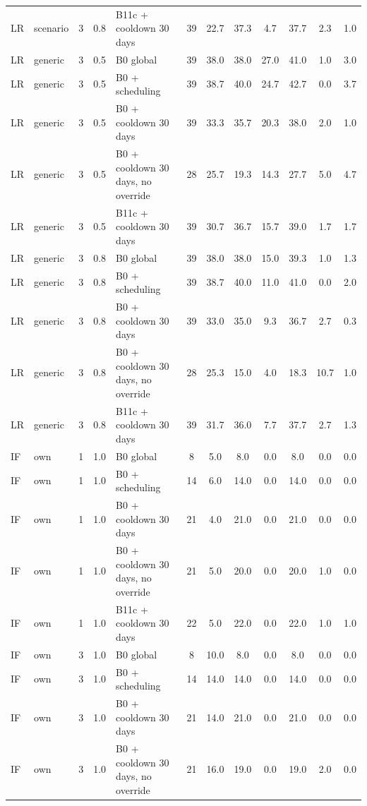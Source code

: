 \documentclass[10pt,onecolumn,letterpaper]{article}
\begin{document}
\begin{longtable}{lllllccccccc}
LR & scenario & 3 & 0.8 & B11c + cooldown 30 days & 39 & 22.7 & 37.3 & 4.7 & 37.7 & 2.3 & 1.0 \\
LR & generic & 3 & 0.5 & B0 global & 39 & 38.0 & 38.0 & 27.0 & 41.0 & 1.0 & 3.0 \\
LR & generic & 3 & 0.5 & B0 + scheduling & 39 & 38.7 & 40.0 & 24.7 & 42.7 & 0.0 & 3.7 \\
LR & generic & 3 & 0.5 & B0 + cooldown 30 days & 39 & 33.3 & 35.7 & 20.3 & 38.0 & 2.0 & 1.0 \\
LR & generic & 3 & 0.5 & B0 + cooldown 30 days, no override & 28 & 25.7 & 19.3 & 14.3 & 27.7 & 5.0 & 4.7 \\
LR & generic & 3 & 0.5 & B11c + cooldown 30 days & 39 & 30.7 & 36.7 & 15.7 & 39.0 & 1.7 & 1.7 \\
LR & generic & 3 & 0.8 & B0 global & 39 & 38.0 & 38.0 & 15.0 & 39.3 & 1.0 & 1.3 \\
LR & generic & 3 & 0.8 & B0 + scheduling & 39 & 38.7 & 40.0 & 11.0 & 41.0 & 0.0 & 2.0 \\
LR & generic & 3 & 0.8 & B0 + cooldown 30 days & 39 & 33.0 & 35.0 & 9.3 & 36.7 & 2.7 & 0.3 \\
LR & generic & 3 & 0.8 & B0 + cooldown 30 days, no override & 28 & 25.3 & 15.0 & 4.0 & 18.3 & 10.7 & 1.0 \\
LR & generic & 3 & 0.8 & B11c + cooldown 30 days & 39 & 31.7 & 36.0 & 7.7 & 37.7 & 2.7 & 1.3 \\
IF & own & 1 & 1.0 & B0 global & 8 & 5.0 & 8.0 & 0.0 & 8.0 & 0.0 & 0.0 \\
IF & own & 1 & 1.0 & B0 + scheduling & 14 & 6.0 & 14.0 & 0.0 & 14.0 & 0.0 & 0.0 \\
IF & own & 1 & 1.0 & B0 + cooldown 30 days & 21 & 4.0 & 21.0 & 0.0 & 21.0 & 0.0 & 0.0 \\
IF & own & 1 & 1.0 & B0 + cooldown 30 days, no override & 21 & 5.0 & 20.0 & 0.0 & 20.0 & 1.0 & 0.0 \\
IF & own & 1 & 1.0 & B11c + cooldown 30 days & 22 & 5.0 & 22.0 & 0.0 & 22.0 & 1.0 & 1.0 \\
IF & own & 3 & 1.0 & B0 global & 8 & 10.0 & 8.0 & 0.0 & 8.0 & 0.0 & 0.0 \\
IF & own & 3 & 1.0 & B0 + scheduling & 14 & 14.0 & 14.0 & 0.0 & 14.0 & 0.0 & 0.0 \\
IF & own & 3 & 1.0 & B0 + cooldown 30 days & 21 & 14.0 & 21.0 & 0.0 & 21.0 & 0.0 & 0.0 \\
IF & own & 3 & 1.0 & B0 + cooldown 30 days, no override & 21 & 16.0 & 19.0 & 0.0 & 19.0 & 2.0 & 0.0 \\

\end{longtable}
\end{document}
